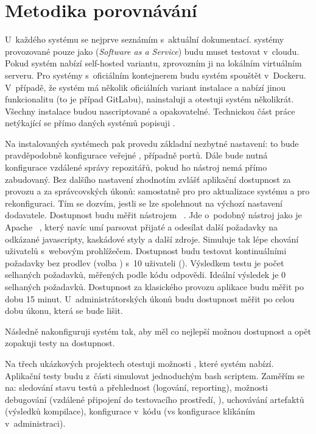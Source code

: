 \section{Metodika porovnávání}
    U~každého systému se nejprve seznámím s~aktuální dokumentací. \CICD systémy provozované pouze jako  (\textit{Software as a Service}) budu muset testovat v~cloudu. Pokud systém nabízí self-hosted variantu, zprovozním ji na lokálním virtuálním serveru. Pro systémy s~oficiálním kontejnerem budu systém spouštět v~Dockeru. V~případě, že systém má několik oficiálních variant instalace a nabízí jinou funkcionalitu (to je případ GitLabu), nainstaluji a otestuji systém několikrát. Všechny instalace budou nascriptované a opakovatelné. Technickou část práce netýkající se přímo daných \CICD systémů popisuji .

    Na instalovaných systémech pak provedu základní nezbytné nastavení: to bude pravděpodobně konfigurace veřejné , případně portů. Dále bude nutná konfigurace vzdálené správy repozitářů, pokud ho \CICD nástroj nemá přímo zabudovaný. Bez dalšího nastavení zhodnotím zvlášť aplikační dostupnost za provozu a za správcovských úkonů: samostatně pro pro aktualizace \CI systému a pro rekonfiguraci. Tím se dozvím, jestli se lze spolehnout na výchozí nastavení dodavatele. Dostupnost budu měřit nástrojem ~\cite{fulmer-siege}. Jde o~podobný nástroj jako je Apache ~\cite{apache-ab}, který navíc umí parsovat přijaté  a odesílat další požadavky na odkázané javascripty, kaskádové styly a další zdroje. Simuluje tak lépe chování uživatelů s~webovým prohlížečem. Dostupnost budu testovat kontinuálními požadavky bez prodlev (volba ) s~10 uživateli (). Výsledkem testu je počet selhaných požadavků, měřených podle \HTTP kódu odpovědi. Ideální výsledek je 0 selhaných požadavků. Dostupnost za klasického provozu aplikace budu měřit po dobu 15 minut. U~administrátorských úkonů budu dostupnost měřit po celou dobu úkonu, která se bude lišit.

    Následně nakonfiguruji systém tak, aby měl co nejlepší možnou dostupnost a opět zopakuji testy na dostupnost.

    Na třech ukázkových projektech otestuji možnosti \CI, které systém nabízí. Aplikační testy budu z~části simulovat jednoduchým bash scriptem.  Zaměřím se na: sledování stavu testů a přehlednost (logování, reporting), možnosti debugování (vzdálené připojení do testovacího prostředí, ), uchovávání artefaktů (výsledků kompilace), konfigurace v~kódu (vs konfigurace klikáním v~administraci).

